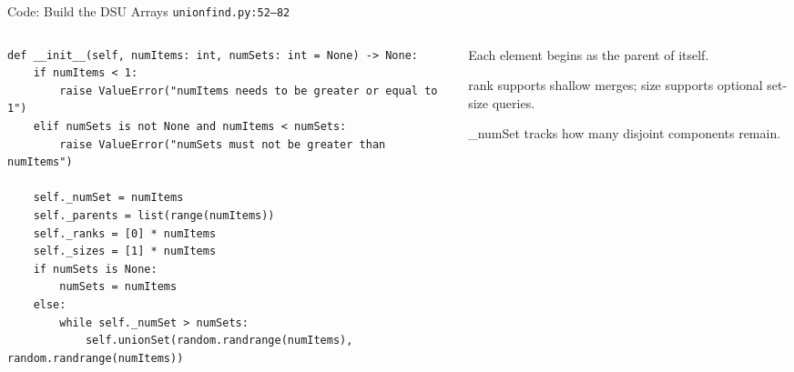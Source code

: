 \documentclass[aspectratio=169,11pt]{beamer}
\begin{document}
\begin{frame}[fragile]{Code: Build the DSU Arrays}
\scriptsize
{} \texttt{unionfind.py:52--82}

\vspace{0.08cm}
\begin{columns}[T,totalwidth=\textwidth]
\begin{column}{0.58\textwidth}
\begin{lstlisting}[style=cpcode]
def __init__(self, numItems: int, numSets: int = None) -> None:
    if numItems < 1:
        raise ValueError("numItems needs to be greater or equal to 1")
    elif numSets is not None and numItems < numSets:
        raise ValueError("numSets must not be greater than numItems")

    self._numSet = numItems
    self._parents = list(range(numItems))
    self._ranks = [0] * numItems
    self._sizes = [1] * numItems
    if numSets is None:
        numSets = numItems
    else:
        while self._numSet > numSets:
            self.unionSet(random.randrange(numItems), random.randrange(numItems))
\end{lstlisting}
\end{column}
\begin{column}{0.38\textwidth}
\begin{tightitemize}
  \item Each element begins as the parent of itself.
  \item rank supports shallow merges; size supports optional set-size queries.
  \item \_numSet tracks how many disjoint components remain.
\end{tightitemize}
\end{column}
\end{columns}
\end{frame}
\end{document}

